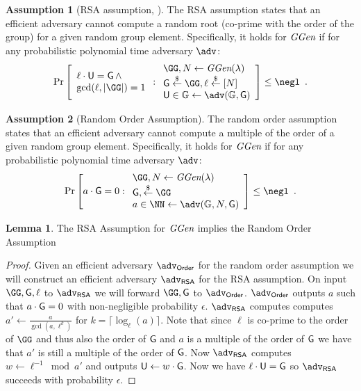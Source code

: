 \documentclass{article}
\theoremstyle{definition}
\newtheorem{lemma}{Lemma}
\newtheorem{assumption}{Assumption}
\begin{document}
\begin{assumption}[RSA assumption, \cite{RivShaAdl78,EC:CouPetPoi17}]
	The RSA assumption states that an efficient adversary cannot compute a random root (co-prime with the order of the group) for a given random group element. Specifically, it holds for $\textit{GGen}$ if for any probabilistic polynomial time adversary $\adv$:
	\[
    \Pr\left[
    \begin{array}{l}
    \ell \cdot \gr{U} = \Generator \, \wedge \\
    \gcd(\ell,|\GG|)=1
    \end{array} :
    \begin{array}{l}
         \GG, N \leftarrow \ggen(\lambda)  \\
         \Generator \sample \GG, \ell \sample [N]  \\
         \gr{U} \in \mathbb{G} \leftarrow \adv(\mathbb{G}, \Generator) \\
    \end{array}\right] \leq \negl \enspace .
\]

\end{assumption}

\begin{assumption}[Random Order Assumption]
	The random order assumption states that an efficient adversary cannot compute a multiple of the order of a given random group element. Specifically, it holds for $\textit{GGen}$ if for any probabilistic polynomial time adversary $\adv$:
	\[
    \Pr\left[a\cdot \Generator =0:
    \begin{array}{l}
         \GG, N \leftarrow \ggen(\lambda)  \\
         \Generator, \sample \GG\\
         a \in \NN \leftarrow \adv(\mathbb{G},N, \Generator) \\
    \end{array}\right] \leq \negl \enspace .
    \]
\end{assumption}
\begin{lemma}
\label{lem:roa-to-rsa}
	The RSA Assumption for $\textit{GGen}$ implies the Random Order Assumption
	\end{lemma}
\begin{proof}
	Given an efficient adversary $\adv_{\textsf{Order}}$ for the random order assumption we will construct an efficient adversary $\adv_{\textsf{RSA}}$ for the RSA assumption. On input $\GG,\Generator,\ell$ to $\adv_{\textsf{RSA}}$ we will forward $\GG,\Generator$ to $\adv_{\textsf{Order}}$. $\adv_{\textsf{Order}}$ outputs $a$ such that $a\cdot \mathsf{G}=0$ with non-negligible probability $\epsilon$. 
	$\adv_{\textsf{RSA}}$ computes computes $a'\gets \frac{a}{\gcd(a,\ell^k)}$ for $k=\lceil\log_\ell(a)\rceil$. Note that since $\ell$ is co-prime to the order of $\GG$ and thus also the order of $\mathsf{G}$ and $a$ is a multiple of the order of $\mathsf{G}$ we have that $a'$ is still a multiple of the order of $\mathsf{G}$. Now $\adv_{\textsf{RSA}}$ computes $w\gets \ell^{-1} \bmod a'$ and outputs $\mathsf{U} \gets w\cdot \mathsf{G}$. Now we have $\ell \cdot \mathsf{U}=\mathsf{G}$ so $\adv_{\textsf{RSA}}$ succeeds with probability $\epsilon$.
\end{proof}
\end{document}
